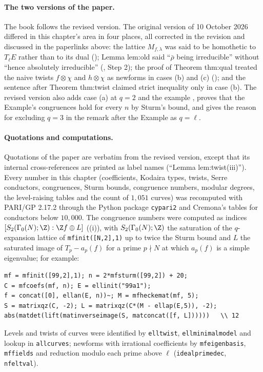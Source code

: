 \paragraph{The two versions of the paper.} The book follows the revised version. The original version of 10 October 2026 differed in this chapter's area
in four places, all corrected in the revision and discussed in the paperlinks above: the lattice $M_{f,\lambda}$ was said to be homothetic to $T_\ell E$ rather
than to its dual (); Lemma lem:old said ``$\bar\rho$ being irreducible'' without ``hence absolutely irreducible''
(, Step 2); the proof of Theorem thm:qual treated the naive twists $f\otimes\chi$ and $h\otimes\chi$ as newforms in cases (b) and (c)
(); and the sentence after Theorem thm:twist claimed strict inequality only in case (b). The revised version also adds case (a) at $q=2$ and
the example , proves that the Example's congruences hold for every $n$ by Sturm's bound, and gives the reason for excluding $q=3$ in the remark after the
Example as $q=\ell$.

\paragraph{Quotations and computations.} Quotations of the paper are verbatim from the revised version, except that its internal cross-references are
printed as label names (``Lemma lem:twist(iii)''). Every number in this chapter (coefficients, Kodaira types, twists, Serre conductors, congruences, Sturm bounds,
congruence numbers, modular degrees, the level-raising tables and the count of $1{,}051$ curves) was recomputed with PARI/GP 2.17.2 \cite{PARI} through the Python package
\texttt{cypari2} and Cremona's tables \cite{Cremona97} for conductors below $10{,}000$. The congruence numbers were computed as indices $[S_2(\Gamma_0(N);\Z):\Z f\oplus L]$
((i)), with $S_2(\Gamma_0(N);\Z)$ the saturation of the $q$-expansion lattice of \texttt{mfinit([N,2],1)} up to twice the Sturm bound and $L$ the saturated
image of $T_p-a_p(f)$ for a prime $p\nmid N$ at which $a_p(f)$ is a simple eigenvalue; for example:
\begin{lstlisting}[language=GP]
mf = mfinit([99,2],1); n = 2*mfsturm([99,2]) + 20;
C = mfcoefs(mf, n); E = ellinit("99a1");
f = concat([0], ellan(E, n))~; M = mfheckemat(mf, 5);
S = matrixqz(C, -2); L = matrixqz(C*(M - ellap(E,5)), -2);
abs(matdet(lift(matinverseimage(S, matconcat([f, L])))))   \\ 12
\end{lstlisting}
Levels and twists of curves were identified by \texttt{elltwist}, \texttt{ellminimalmodel} and lookup in \texttt{allcurves}; newforms with irrational coefficients by
\texttt{mfeigenbasis}, \texttt{mffields} and reduction modulo each prime above $\ell$ (\texttt{idealprimedec}, \texttt{nfeltval}).
